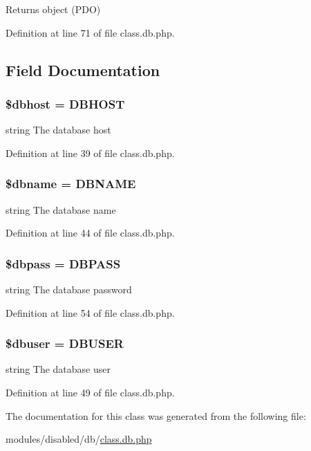 \begin{DoxyReturn}{Returns}
object (P\-D\-O) 
\end{DoxyReturn}


Definition at line 71 of file class.\-db.\-php.



\subsection{Field Documentation}
\hypertarget{class_d_b_a580dd98ba7f04c133d1a1e1b01af4a30}{
\subsubsection[{\$dbhost}]{\setlength{\rightskip}{0pt plus 5cm}\$dbhost = {\bf D\-B\-H\-O\-S\-T}\hspace{0.3cm}{\ttfamily [static]}}}\label{class_d_b_a580dd98ba7f04c133d1a1e1b01af4a30}
string The database host 

Definition at line 39 of file class.\-db.\-php.

\hypertarget{class_d_b_ac5111a571fffa2499732833bb7f0d8c1}{
\subsubsection[{\$dbname}]{\setlength{\rightskip}{0pt plus 5cm}\$dbname = {\bf D\-B\-N\-A\-M\-E}\hspace{0.3cm}{\ttfamily [static]}}}\label{class_d_b_ac5111a571fffa2499732833bb7f0d8c1}
string The database name 

Definition at line 44 of file class.\-db.\-php.

\hypertarget{class_d_b_a95e283b6dd5867f7b99c160bebf9826c}{
\subsubsection[{\$dbpass}]{\setlength{\rightskip}{0pt plus 5cm}\$dbpass = {\bf D\-B\-P\-A\-S\-S}\hspace{0.3cm}{\ttfamily [static]}}}\label{class_d_b_a95e283b6dd5867f7b99c160bebf9826c}
string The database password 

Definition at line 54 of file class.\-db.\-php.

\hypertarget{class_d_b_a8d5ac1c3396a540f025f9bbe56a5b568}{
\subsubsection[{\$dbuser}]{\setlength{\rightskip}{0pt plus 5cm}\$dbuser = {\bf D\-B\-U\-S\-E\-R}\hspace{0.3cm}{\ttfamily [static]}}}\label{class_d_b_a8d5ac1c3396a540f025f9bbe56a5b568}
string The database user 

Definition at line 49 of file class.\-db.\-php.



The documentation for this class was generated from the following file\-:\begin{DoxyCompactItemize}
\item 
modules/disabled/db/\hyperlink{class_8db_8php}{class.\-db.\-php}\end{DoxyCompactItemize}
